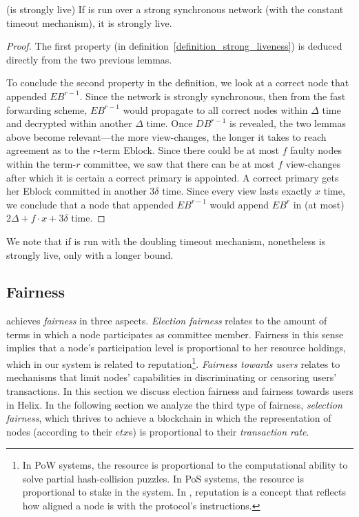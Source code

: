 \begin{corollary}{(\name is strongly live)}
If \name is run over a strong synchronous network (with the constant timeout mechanism), it is strongly live.
\end{corollary}
\begin{proof}
The first property (in definition~\ref{definition_strong_liveness}) is deduced directly from the two previous lemmas.

To conclude the second property in the definition, we look at a correct node that appended $EB^{r-1}$. Since the network is strongly synchronous, then from the fast forwarding scheme, $EB^{r-1}$ would propagate to all correct nodes within $\Delta$ time and decrypted within another $\Delta$ time. Once $DB^{r-1}$ is revealed, the two lemmas above become relevant---the more view-changes, the longer it takes to reach agreement as to the $r$-term Eblock. Since there could be at most $f$ faulty nodes within the term-$r$ committee, we saw that there can be at most $f$ view-changes after which it is certain a correct primary is appointed. A correct primary gets her Eblock committed in another $3\delta$ time. Since every view lasts exactly $x$ time, we conclude that a node that appended $EB^{r-1}$ would append $EB^r$ in (at most) $2\Delta+f\cdot x+3\delta$ time.
\end{proof}
We note that if \name is run with the doubling timeout mechanism, nonetheless \name is strongly live, only with a longer bound. 

\subsection{Fairness}
\label{section_properties_fairness}
\name achieves \emph{fairness} in three aspects. \emph{Election fairness} relates to the amount of terms in which a node participates as committee member. Fairness in this sense implies that a node's participation level is proportional to her resource holdings, which in our system is related to reputation\footnote{In PoW systems, the resource is proportional to the computational ability to solve partial hash-collision puzzles. In PoS systems, the resource is proportional to stake in the system. In \nameNS, reputation is a concept that reflects how aligned a node is with the protocol's instructions.}. \emph{Fairness towards users} relates to mechanisms that limit nodes' capabilities in discriminating or censoring users' transactions. In this section we discuss election fairness and fairness towards users in Helix. In the following section we analyze the third type of fairness, \emph{selection fairness}, which thrives to achieve a blockchain in which the representation of nodes (according to their $etx$s) is proportional to their \emph{transaction rate}.


